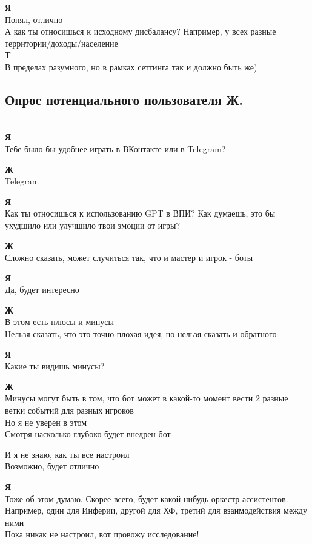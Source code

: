\textbf{Я}\\
Понял, отлично\\
А как ты относишься к исходному дисбалансу? Например, у всех разные территории/доходы/население\\

\textbf{Т}\\
В пределах разумного, но в рамках сеттинга так и должно быть же)\\

\subsection{Опрос потенциального пользователя Ж.}\\
\textbf{Я}\\
Тебе было бы удобнее играть в ВКонтакте или в Telegram?

\textbf{Ж}\\
Telegram

\textbf{Я}\\
Как ты относишься к использованию GPT в ВПИ? Как думаешь, это бы ухудшило или улучшило твои эмоции от игры?

\textbf{Ж}\\
Сложно сказать, может случиться так, что и мастер и игрок - боты

\textbf{Я}\\
Да, будет интересно

\textbf{Ж}\\
В этом есть плюсы и минусы\\
Нельзя сказать, что это точно плохая идея, но нельзя сказать и обратного

\textbf{Я}\\
Какие ты видишь минусы?

\textbf{Ж}\\
Минусы могут быть в том, что бот может в какой-то момент вести 2 разные ветки событий для разных игроков\\
Но я не уверен в этом\\
Смотря насколько глубоко будет внедрен бот

И я не знаю, как ты все настроил\\
Возможно, будет отлично

\textbf{Я}\\
Тоже об этом думаю. Скорее всего, будет какой-нибудь оркестр ассистентов. Например, один для Инферии, другой для ХФ, третий для взаимодействия между ними\\
Пока никак не настроил, вот провожу исследование!

